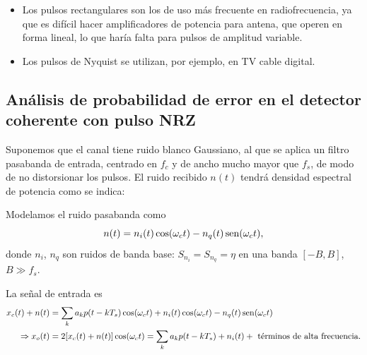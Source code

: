 \newpage

    \begin{itemize}
        \item Los pulsos rectangulares son los de uso más frecuente en radiofrecuencia, ya que es
             difícil hacer amplificadores de potencia para antena, que operen en forma lineal, lo que haría falta para pulsos de amplitud variable.
        \item Los pulsos de Nyquist se utilizan, por ejemplo, en TV cable digital.
    \end{itemize}



\subsection*{Análisis de probabilidad de error en el detector coherente con pulso NRZ}

Suponemos que el canal tiene ruido blanco Gaussiano, al que se
aplica un filtro pasabanda de entrada, centrado en $f_c$ y de
ancho mucho mayor que $f_s$, de modo de no distorsionar los
pulsos. El ruido recibido $n(t)$ tendrá densidad espectral de
potencia como se indica:

\begin{center}\begin{minipage}{\textwidth}
    \endpgfgraphicnamed\end{minipage}
\end{center}

Modelamos el ruido pasabanda como
\[n(t) = n_i(t)\cos(\omega_ct) - n_q(t)\operatorname{sen}(\omega_ct),\]
donde $n_i$, $n_q$ son ruidos de banda base: $S_{n_i}=S_{n_q} =
\eta$ en una banda $[-B,B]$, $B \gg f_s$.

La señal de entrada es
\begin{align*}
    x_c(t)+n(t) &= \sum_k a_k p(t-kT_s)\cos(\omega_ct) + n_i(t)\cos(\omega_ct) - n_q(t)\operatorname{sen}(\omega_ct)\\
    \Rightarrow x_o(t) &= 2 [x_c(t)+n(t)]\cos(\omega_ct) = \sum_k a_k p(t-kT_s) + n_i(t) + \text{ términos de
    alta frecuencia.}
\end{align*}

